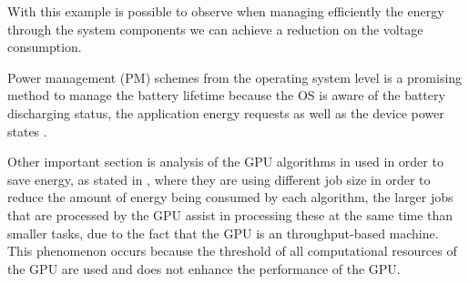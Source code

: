 \documentclass[conference]{IEEEtran}
\begin{document}
\begin{table}[h]
\caption{Daily energy use and battery life under a number of usage patterns  \cite{CarrollAnalysis}.}
\end{table}

With this example is possible to observe when managing efficiently the energy through the system components we can achieve a reduction on the voltage consumption.
 
Power management (PM) schemes from the operating system level is a promising method to manage the battery lifetime because the OS is aware of the battery discharging status, the application energy requests as well as the device power states \cite{PADM02}.
 
Other important section is analysis of the GPU algorithms in used in order to save energy, as stated in \cite{ARIUN01}, where they are using different job size in order to reduce the amount of energy being consumed by each algorithm, the larger jobs that are  processed by the GPU assist in processing these at the same time than smaller tasks, due to the fact that the GPU is an throughput-based machine. This phenomenon occurs because the threshold of all computational resources of the GPU are used and does not enhance the performance of the GPU. 
 
\end{document}
